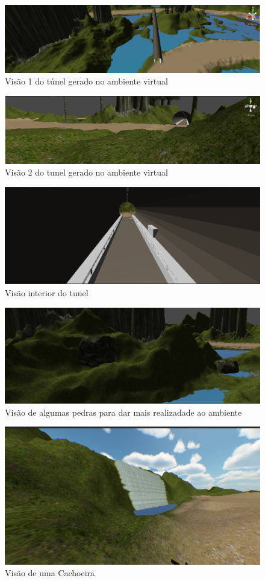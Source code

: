 \begin{figure}[htpb]
 \begin{center}
    \includegraphics[width=.60\textwidth]{figuras/tunel1.png}
 \end{center}
  \caption{Visão 1 do túnel gerado no ambiente virtual}
  \label{fig:core_concurrent}
\end{figure}

\begin{figure}[htpb]
 \begin{center}
    \includegraphics[width=.60\textwidth]{figuras/tunel2.png}
 \end{center}
  \caption{Visão 2 do tunel gerado no ambiente virtual}
  \label{fig:core_concurrent}
\end{figure}

\begin{figure}[htpb]
 \begin{center}
    \includegraphics[width=.60\textwidth]{figuras/tunel3.png}
 \end{center}
  \caption{Visão interior do tunel}
  \label{fig:core_concurrent}
\end{figure}

\begin{figure}[htpb]
 \begin{center}
    \includegraphics[width=.60\textwidth]{figuras/rock.png}
 \end{center}
  \caption{Visão de algumas pedras para dar mais realizadade ao ambiente}
  \label{fig:core_concurrent}
\end{figure}

\begin{figure}[htpb]
 \begin{center}
    \includegraphics[width=.60\textwidth]{figuras/waterfall.png}
 \end{center}
  \caption{Visão de uma Cachoeira}
  \label{fig:core_concurrent}
\end{figure}

